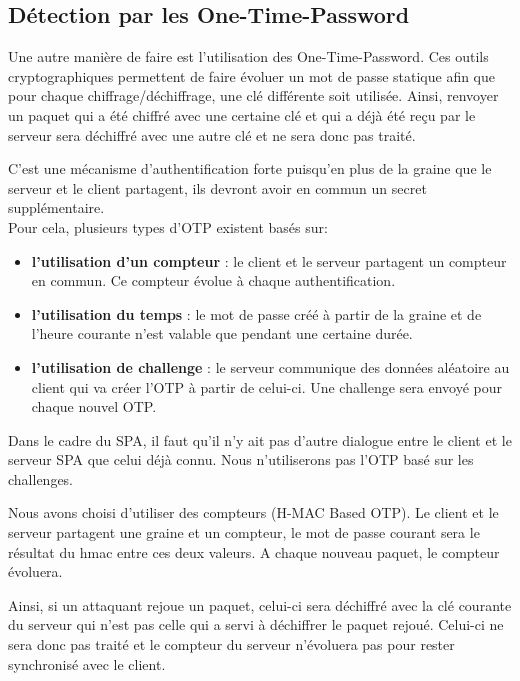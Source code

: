 \subsection{Détection par les \textbf{O}ne-\textbf{T}ime-\textbf{P}assword}

Une autre manière de faire est l'utilisation des One-Time-Password. Ces outils cryptographiques permettent de faire évoluer un mot de passe statique afin que pour chaque chiffrage/déchiffrage, une clé différente soit utilisée. Ainsi, renvoyer un paquet qui a été chiffré avec une certaine clé et qui a déjà été reçu par le serveur sera déchiffré avec une autre clé et ne sera donc pas traité.

C'est une mécanisme d'authentification forte puisqu'en plus de la graine que le serveur et le client partagent, ils devront avoir en commun un secret supplémentaire.\\

Pour cela, plusieurs types d'OTP existent basés sur:

\begin{itemize}

\item \textbf{l'utilisation d'un compteur} : le client et le serveur partagent un compteur en commun. Ce compteur évolue à chaque authentification.

\item \textbf{l'utilisation du temps} : le mot de passe créé à partir de la graine et de l'heure courante n'est valable que pendant une certaine durée.

\item \textbf{l'utilisation de challenge} : le serveur communique des données aléatoire au client qui va créer l'OTP à partir de celui-ci. Une challenge sera envoyé pour chaque nouvel OTP.

\end{itemize}

\vspace{0.5cm}

Dans le cadre du SPA, il faut qu'il n'y ait pas d'autre dialogue entre le client et le serveur SPA que celui déjà connu. Nous n'utiliserons pas l'OTP basé sur les challenges.

Nous avons choisi d'utiliser des compteurs (H-MAC Based OTP). Le client et le serveur partagent une graine et un compteur, le mot de passe courant sera le résultat du hmac entre ces deux valeurs. A chaque nouveau paquet, le compteur évoluera.

Ainsi, si un attaquant rejoue un paquet, celui-ci sera déchiffré avec la clé courante du serveur qui n'est pas celle qui a servi à déchiffrer le paquet rejoué. Celui-ci ne sera donc pas traité et le compteur du serveur n'évoluera pas pour rester synchronisé avec le client.

